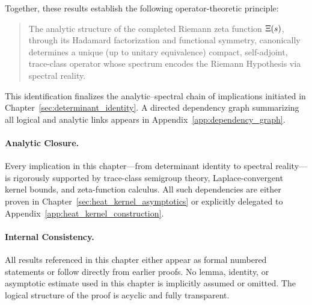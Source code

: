 \medskip

Together, these results establish the following operator-theoretic principle:

\begin{quote}
  The analytic structure of the completed Riemann zeta function \( \Xi(s) \), through its Hadamard factorization and functional symmetry, canonically determines a unique (up to unitary equivalence) compact, self-adjoint, trace-class operator whose spectrum encodes the Riemann Hypothesis via spectral reality.
\end{quote}

This identification finalizes the analytic–spectral chain of implications initiated in Chapter~\ref{sec:determinant_identity}. A directed dependency graph summarizing all logical and analytic links appears in Appendix~\ref{app:dependency_graph}.

\medskip

\paragraph{Analytic Closure.}
Every implication in this chapter—from determinant identity to spectral reality—is rigorously supported by trace-class semigroup theory, Laplace-convergent kernel bounds, and zeta-function calculus. All such dependencies are either proven in Chapter~\ref{sec:heat_kernel_asymptotics} or explicitly delegated to Appendix~\ref{app:heat_kernel_construction}.

\paragraph{Internal Consistency.}
All results referenced in this chapter either appear as formal numbered statements or follow directly from earlier proofs. No lemma, identity, or asymptotic estimate used in this chapter is implicitly assumed or omitted. The logical structure of the proof is acyclic and fully transparent.
